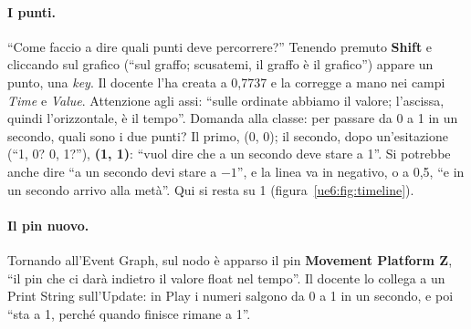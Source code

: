 \paragraph{I punti.} ``Come faccio a dire quali punti deve percorrere?'' Tenendo premuto
\textbf{Shift} e cliccando sul grafico (``sul graffo; scusatemi, il graffo è il
grafico'') appare un punto, una \emph{key}. Il docente l'ha creata a 0,7737 e la
corregge a mano nei campi \emph{Time} e \emph{Value}. Attenzione agli assi: ``sulle
ordinate abbiamo il valore; l'ascissa, quindi l'orizzontale, è il tempo''. Domanda alla
classe: per passare da 0 a 1 in un secondo, quali sono i due punti? Il primo, (0, 0); il
secondo, dopo un'esitazione (``1, 0? 0, 1?''), \textbf{(1, 1)}: ``vuol dire che a un
secondo deve stare a 1''. Si potrebbe anche dire ``a un secondo devi stare a $-1$'', e la
linea va in negativo, o a 0,5, ``e in un secondo arrivo alla metà''. Qui si resta su 1
(figura~\ref{ue6:fig:timeline}).

\paragraph{Il pin nuovo.} Tornando all'Event Graph, sul nodo è apparso il pin
\textbf{Movement Platform Z}, ``il pin che ci darà indietro il valore float nel tempo''.
Il docente lo collega a un Print String sull'Update: in Play i numeri salgono da 0 a 1
in un secondo, e poi ``sta a 1, perché quando finisce rimane a 1''.

